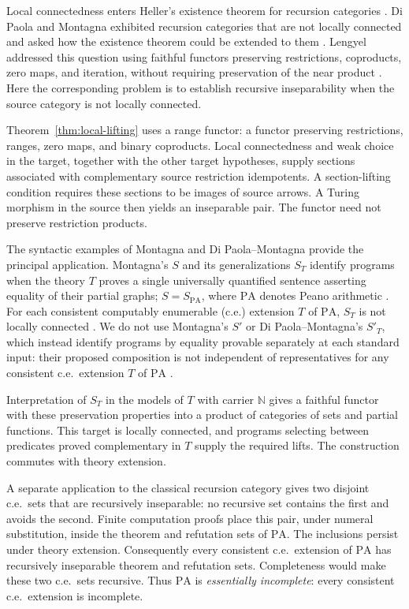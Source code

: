 \documentclass[11pt]{article}
\newcommand{\N}{\mathbb N}
\newcommand{\PA}{\mathrm{PA}}
\begin{document}
Local connectedness enters Heller's existence theorem for recursion
categories \cite[Sections 8--9]{Heller}. Di Paola and Montagna
exhibited recursion categories that are not locally connected and
asked how the existence theorem could be extended to them
\cite{DPM}. Lengyel addressed this question using faithful functors
preserving restrictions, coproducts, zero maps, and iteration, without
requiring preservation of the near product \cite{Lengyel2004,Corrections}.
Here the corresponding problem is to establish recursive inseparability
when the source category is not locally connected.

Theorem~\ref{thm:local-lifting}
uses a range functor: a functor preserving restrictions, ranges, zero
maps, and binary coproducts. Local connectedness and weak choice in
the target, together with the other target hypotheses, supply sections
associated with complementary source restriction idempotents.
A section-lifting condition requires these sections to be images of
source arrows. A Turing morphism in the source then yields an
inseparable pair. The functor need not preserve restriction products.

The syntactic examples of Montagna and Di Paola--Montagna provide
the principal application. Montagna's $S$ and its generalizations
$S_T$ identify programs when the theory $T$ proves a single universally
quantified sentence asserting equality of their partial graphs;
$S=S_{\PA}$, where $\PA$ denotes Peano arithmetic
\cite{Montagna,DPM}. For each consistent computably enumerable
(c.e.) extension $T$ of $\PA$, $S_T$ is not locally connected
\cite[Corollary 4.4]{DPM}.
We do not use Montagna's $S'$ or Di Paola--Montagna's $S'_T$,
which instead identify programs by equality provable separately at
each standard input: their proposed composition is not independent
of representatives for any consistent c.e.\ extension $T$ of $\PA$
\cite[Corollary 2]{Composition}.

Interpretation of $S_T$ in the models of $T$ with
carrier $\N$ gives a faithful functor with these preservation properties
into a product of categories of sets and partial functions. This target
is locally connected, and
programs selecting between predicates proved complementary in $T$
supply the required lifts. The construction commutes with theory
extension.

A separate application to the classical recursion category gives two
disjoint c.e.\ sets that are recursively inseparable: no recursive set
contains the first and avoids the second. Finite computation proofs
place this pair, under numeral substitution, inside the theorem and
refutation sets of $\PA$. The inclusions persist under theory extension.
Consequently every consistent c.e.\ extension of $\PA$ has recursively
inseparable theorem and refutation sets. Completeness would make these
two c.e.\ sets recursive. Thus $\PA$ is \emph{essentially incomplete}:
every consistent c.e.\ extension is incomplete.
\end{document}
